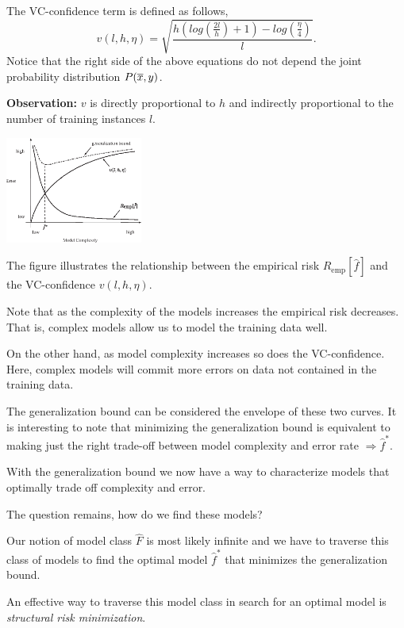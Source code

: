 \documentclass[a4paper,blends,pdf,colorBG,slideColor]{prosper}
\begin{document}
The VC-confidence term is defined as follows,
\[
v(l,h,\eta) = \sqrt{\frac{h(log(\frac{2l}{h})+1) - log(\frac{\eta}{4})}{l}}.
\]
Notice that the right side of the above equations 
do not depend the joint probability distribution $P(\overline{x},y)$.

{\bf Observation:} $v$ is directly proportional to $h$ and indirectly proportional to the number 
of training instances $l$.
\es

\small
\begin{center}
\includegraphics[height=35mm]{figures/fig10-06.eps}
\end{center}
The figure illustrates the relationship between
the empirical risk $R_{\text{emp}}[\hat{f}]$ and the VC-confidence $v(l,h,\eta)$.

Note that as the complexity of the models increases the empirical risk
decreases.  
That is, complex models allow us to model the training data well.

On the other hand, as model complexity increases so does the VC-confidence.  
Here, complex models will commit more errors on data not contained in the training data.

The generalization bound can be considered the envelope of these two curves.
It is interesting to note that minimizing the generalization bound
is equivalent to making just the right trade-off between model complexity
and error rate $\Rightarrow \hat{f}^*$.

\es

With the generalization bound we now have a way to characterize models that optimally trade off complexity and error.

The question remains,
how do we find these models?  

Our notion of model class $\hat{F}$ is most likely
infinite and we have to traverse this class of models to find the optimal
model $\hat{f}^*$ that minimizes the generalization bound. 

An effective way to traverse this model class in search for an optimal model
is {\em structural risk minimization}.
\es
\end{document}
